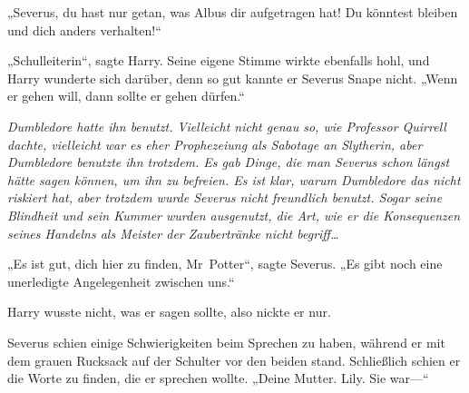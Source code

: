 „Severus, du hast nur getan, was Albus dir aufgetragen hat! Du könntest bleiben und dich anders verhalten!“

„Schulleiterin“, sagte Harry.
Seine eigene Stimme wirkte ebenfalls hohl, und Harry wunderte sich darüber, denn so gut kannte er Severus Snape nicht.
„Wenn er gehen will, dann sollte er gehen dürfen.“

\emph{Dumbledore hatte ihn benutzt. Vielleicht nicht genau so, wie Professor Quirrell dachte, vielleicht war es eher Prophezeiung als Sabotage an Slytherin, aber Dumbledore benutzte ihn trotzdem. Es gab Dinge, die man Severus schon längst hätte sagen können, um ihn zu befreien. Es ist klar, warum Dumbledore das nicht riskiert hat, aber trotzdem wurde Severus nicht freundlich benutzt. Sogar seine Blindheit und sein Kummer wurden ausgenutzt, die Art, wie er die Konsequenzen seines Handelns als Meister der Zaubertränke nicht begriff…}

„Es ist gut, dich hier zu finden, Mr~Potter“, sagte Severus. „Es gibt noch eine unerledigte Angelegenheit zwischen uns.“

Harry wusste nicht, was er sagen sollte, also nickte er nur.

Severus schien einige Schwierigkeiten beim Sprechen zu haben, während er mit dem grauen Rucksack auf der Schulter vor den beiden stand. Schließlich schien er die Worte zu finden, die er sprechen wollte.
„Deine Mutter. Lily. Sie war—“

